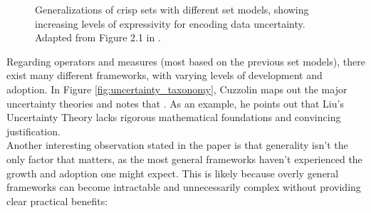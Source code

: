 \begin{figure}[ht]
    \caption{Generalizations of crisp sets with different set models, showing increasing levels of expressivity for encoding data uncertainty. Adapted from Figure 2.1 in \cite{UncertaintySciences}.}
    \label{fig:Generalized_sets}
\end{figure}



Regarding operators and measures (most based on the previous set models), there exist many different frameworks, with varying levels of development and adoption. In Figure \ref{fig:uncertainty_taxonomy}, Cuzzolin \cite{uncertaintymeasuresbigpicture} maps out the major uncertainty theories and notes that . As an example, he points out that Liu's Uncertainty Theory lacks rigorous mathematical foundations and convincing justification. \\

Another interesting observation stated in the paper is that generality isn't the only factor that matters, as the most general frameworks haven't experienced the growth and adoption one might expect. This is likely because overly general frameworks can become intractable and unnecessarily complex without providing clear practical benefits:

